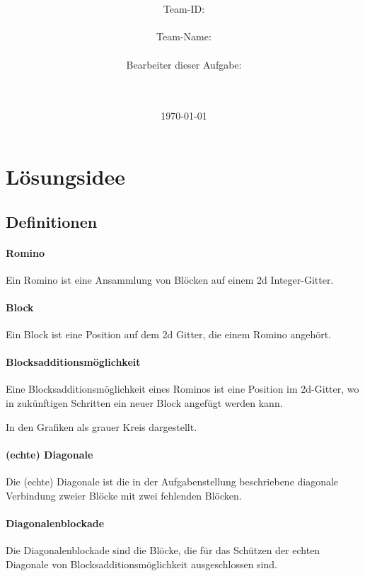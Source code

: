 \documentclass[a4paper,10pt,ngerman]{scrartcl}
\title{\textbf{\Huge\Aufgabe}}
\author{\LARGE Team-ID: \LARGE \TeamID \\\\
	    \LARGE Team-Name: \LARGE \TeamName \\\\
	    \LARGE Bearbeiter dieser Aufgabe: \\ 
	    \LARGE \Namen\\\\}
\date{\LARGE\today}
\begin{document}
\maketitle
\tableofcontents


\section{Lösungsidee}

\subsection{Definitionen}

\paragraph{Romino}

Ein Romino ist eine Ansammlung von Blöcken auf einem 2d Integer-Gitter.

\paragraph{Block}

Ein Block ist eine Position auf dem 2d Gitter, die einem Romino angehört.

\paragraph{Blocksadditionsmöglichkeit}

Eine Blocksadditionsmöglichkeit eines Rominos ist eine Position im 2d-Gitter, wo in zukünftigen Schritten ein neuer Block angefügt werden kann.

In den Grafiken als grauer Kreis dargestellt.

\paragraph{(echte) Diagonale}

Die (echte) Diagonale ist die in der Aufgabenstellung beschriebene diagonale Verbindung zweier Blöcke mit zwei fehlenden Blöcken.

\paragraph{Diagonalenblockade}

Die Diagonalenblockade sind die Blöcke, die für das Schützen der echten Diagonale von Blocksadditionsmöglichkeit ausgeschlossen sind.
\end{document}
